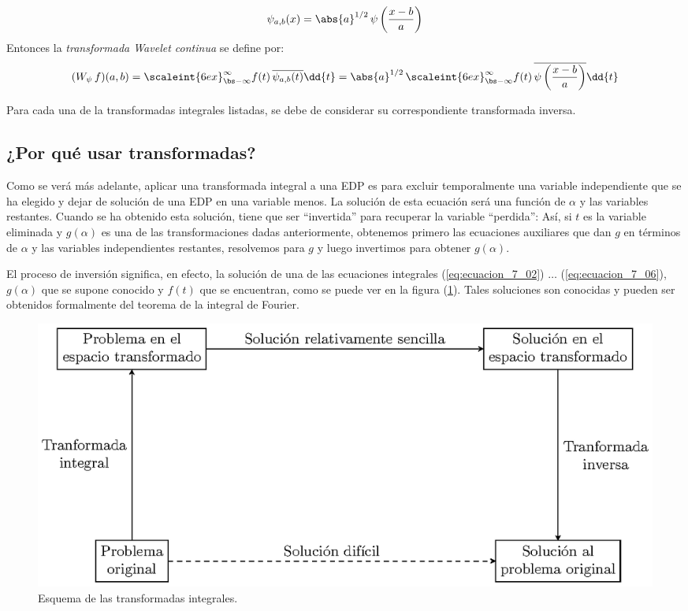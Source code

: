\begin{enumerate}
\begin{align*}
\psi_{a, b} (x) = \abs{a}^{1/2} \, \psi \left( \dfrac{x - b}{a} \right)
\end{align*}
Entonces la \emph{transformada Wavelet continua} se define por:
\begin{align*}
(W_{\psi} \, f) (a, b) = \scaleint{6ex}_{\bs -\infty}^{\infty} f (t) \, \overline{\psi_{a, b} (t)} \dd{t} = \abs{a}^{1/2} \, \scaleint{6ex}_{\bs -\infty}^{\infty} f (t) \, \overline{\psi \left( \dfrac{x - b}{a} \right)} \dd{t}
\end{align*}
\end{enumerate}
Para cada una de la transformadas integrales listadas, se debe de considerar su correspondiente transformada inversa.

\subsection{¿Por qué usar transformadas?}

Como se verá más adelante, aplicar una transformada integral a una EDP es para excluir temporalmente una variable independiente que se ha elegido y dejar de solución de una EDP en una variable menos. La solución de esta ecuación será una función de $\alpha$ y las variables restantes. Cuando se ha obtenido esta solución, tiene que ser \enquote{invertida} para recuperar la variable \enquote{perdida}: Así, si $t$ es la variable eliminada y $g (\alpha)$ es una de las transformaciones dadas anteriormente, obtenemos primero las ecuaciones auxiliares que dan $g$ en términos de $\alpha$ y las variables independientes restantes, resolvemos para $g$ y luego invertimos para obtener $g (\alpha)$.
\par
El proceso de inversión significa, en efecto, la solución de una de las ecuaciones integrales (\ref{eq:ecuacion_7_02}) $\ldots$ (\ref{eq:ecuacion_7_06}), $g (\alpha)$ que se supone conocido y $f (t)$ que se encuentran, como se puede ver en la figura (\ref{fig:figura_01}). Tales soluciones son conocidas y pueden ser obtenidos formalmente del teorema de la integral de Fourier.
\begin{figure}[H]
    \centering
    \includegraphics[scale=1]{Imagenes/esquema_transformadas.eps}
    \caption{Esquema de las transformadas integrales.}
    \label{fig:figura_01}
\end{figure}

